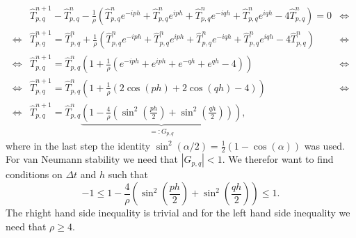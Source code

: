 \documentclass[a4aper,pagesize]{scrartcl}
\theoremstyle{definition}
\theoremstyle{plain}
\theoremstyle{remark}
\renewcommand{\hat}{\widehat}
\begin{document}
\begin{align*}
	  &\hat{T}^{n+1}_{p,q}
	- \hat{T}^{n}_{p,q}
	-\frac{1}{\rho} \left(
		  \hat{T}^{n}_{p,q} e^{-iph}
		+ \hat{T}^{n}_{p,q} e^{iph}
	    + \hat{T}^{n}_{p,q} e^{-iqh}
		+ \hat{T}^{n}_{p,q} e^{iqh}
		-  4 \hat{T}^{n}_{p,q}
	\right)= 0
&\Leftrightarrow\\
\Leftrightarrow
	  &\hat{T}^{n+1}_{p,q} =
      \hat{T}^{n}_{p,q}
	 +\frac{1}{\rho} \left(
		  \hat{T}^{n}_{p,q} e^{-iph}
		+ \hat{T}^{n}_{p,q} e^{iph}
	    + \hat{T}^{n}_{p,q} e^{-iqh}
		+ \hat{T}^{n}_{p,q} e^{iqh}
		-  4 \hat{T}^{n}_{p,q}
	\right)
&\Leftrightarrow\\
\Leftrightarrow
	  &\hat{T}^{n+1}_{p,q} =
      \hat{T}^{n}_{p,q}\left(
      1
	 +\frac{1}{\rho} \left(
		  e^{-iph}
		+ e^{iph}
	    + e^{-qh}
		+ e^{qh}
		-  4
	    \right)
	\right)
&\Leftrightarrow\\
\Leftrightarrow
	  &\hat{T}^{n+1}_{p,q} =
      \hat{T}^{n}_{p,q}\left(
      1
	 +\frac{1}{\rho} \left(
		  2\cos(ph)
	    + 2\cos(qh)
	    - 4
	    \right)
	\right)
&\Leftrightarrow\\
\Leftrightarrow
	  &\hat{T}^{n+1}_{p,q} =
      \hat{T}^{n}_{p,q}\underbrace{\left(
      1
	 -\frac{4}{\rho} \left(
	      \sin^2\left(\frac{ph}{2}\right)
	    + \sin^2\left(\frac{qh}{2}\right)
	    \right)
	  \right)}_{=:G_{p,q}},
\end{align*}
where in the last step the identity $\sin^2(\alpha/2) = \frac{1}{2}(1-\cos(\alpha))$ was used. For van Neumann stability we need that $|G_{p,q}|<1$. We therefor want to find conditions on $\Delta t$ and $h$ such that
\begin{equation}
-1 \le
	1-\frac{4}{\rho} \left(
		  \sin^2\left(\frac{ph}{2}\right)
	    + \sin^2\left(\frac{qh}{2}\right)
	\right)
	\le 1.
\end{equation}
The rhight hand side inequality is trivial and for the left hand side inequality we need that $\rho \geq 4$.
\end{document}

